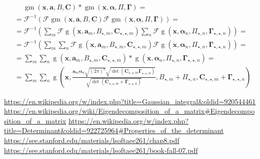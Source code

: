 \documentclass{paper}
\newcommand{\F}{\ensuremath{\mathcal{F}}}
\newcommand{\vr}[1]{\ensuremath{\boldsymbol{#1}}}
\newcommand{\tr}[1]{\ensuremath{\boldsymbol{#1}}}
\newcommand{\f}[1]{\operatorname{#1}}
\newcommand{\alphavec}[0]{\ensuremath{\vr{\alpha{}}}}
\newcommand{\avec}[0]{\ensuremath{\vr{a}}}
\newcommand{\xvec}[0]{\ensuremath{\vr{x}}}
\newcommand{\Ctns}[0]{\ensuremath{\tr{C}}}
\newcommand{\Gammatns}[0]{\ensuremath{\tr{\Gamma}}}
\begin{document}
\begin{align*}
	&\ \quad \f{gm}(\xvec, \avec, B, \Ctns) \ast \f{gm}(\xvec, \alphavec, \Pi, \Gammatns) = \\
	&= \F^{-1}\left(\F\f{gm}(\xvec, \avec, B, \Ctns) \F\f{gm}(\xvec, \alphavec, \Pi, \Gammatns)\right) = \\
	&= \F^{-1}\left(\sum_{m}\F\f{g}(\xvec, \avec_m, B_{\star, m}, \Ctns_{\star, \star, m}) \sum_n \F\f{g}(\xvec, \alphavec_n, \Pi_{\star, n}, \Gammatns_{\star, \star, n})\right) = \\
	&= \F^{-1}\left(\sum_{m}\sum_n  \F\f{g}(\xvec, \avec_m, B_{\star, m}, \Ctns_{\star, \star, m}) \F\f{g}(\xvec, \alphavec_n, \Pi_{\star, n}, \Gammatns_{\star, \star, n})\right) = \\
	&= \sum_{m}\sum_n \f{g}(\xvec, \avec_m, B_{\star, m}, \Ctns_{\star, \star, m}) \ast \f{g}(\xvec, \alphavec_n, \Pi_{\star, n}, \Gammatns_{\star, \star, n}) = \\
	&= \sum_{m}\sum_n \f{g}\left(\xvec, \frac{\avec_m \alphavec_n \sqrt{(2 \pi)^\eta} \sqrt{\f{det}(\Ctns_{\star, \star, m}\Gammatns_{\star, \star, n})}}{\sqrt{\f{det}(\Ctns_{\star, \star, m}+\Gammatns_{\star, \star, n})}}, B_{\star, m} + \Pi_{\star, n}, \Ctns_{\star, \star, m} + \Gammatns_{\star, \star, n}\right)
\end{align*}

\begin{thebibliography}{9}%
	 \url{https://en.wikipedia.org/w/index.php?title=Gaussian_integral&oldid=920544461}
	 \url{https://en.wikipedia.org/wiki/Eigendecomposition_of_a_matrix#Eigendecomposition_of_a_matrix}
	 \url{https://en.wikipedia.org/w/index.php?title=Determinant&oldid=922725964#Properties_of_the_determinant}
	 \url{https://see.stanford.edu/materials/lsoftaee261/chap8.pdf}
	 \url{https://see.stanford.edu/materials/lsoftaee261/book-fall-07.pdf}
\end{thebibliography}
\end{document}
